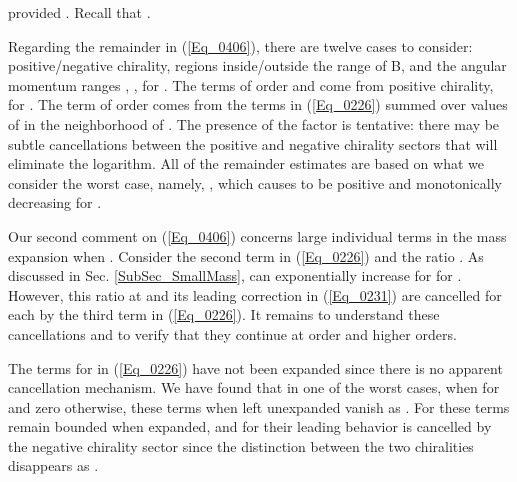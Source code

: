 \documentclass[a4paper,twocolumn,showpacs,preprintnumbers,amsmath,amssymb]{revtex4}
\providecommand{\half}{\frac{1}{2}}
\begin{document}
\noindent
provided \coordHE{}. Recall that
\coordHE{}.

Regarding the remainder in (\ref{Eq_0406}), there are twelve cases to
consider: positive/negative chirality, regions inside/outside the
range of B, and the angular momentum ranges
\coordHE{}, \coordHE{}, \coordHE{} for \coordHE{}. The
terms of order \coordHE{} and
\coordHE{} come from positive chirality,
\coordHE{} for \coordHE{}. The term of order \coordHE{} comes from the
\coordHE{}
terms in (\ref{Eq_0226}) summed over values of \coordHE{} in the neighborhood
of \coordHE{}. The presence of the factor \coordHE{} is
tentative: there may be subtle cancellations between the positive and
negative chirality sectors that will eliminate the logarithm. All of
the \coordHE{} remainder estimates are based on what we consider the
worst case, namely, \coordHE{}, which causes \coordHE{} to be
positive and monotonically decreasing for \coordHE{}.

Our second comment on (\ref{Eq_0406}) concerns large individual terms
in the mass expansion when \coordHE{}. Consider the second term in
(\ref{Eq_0226}) and the ratio \coordHE{}. As
discussed in Sec. \ref{SubSec_SmallMass}, \coordHE{} can exponentially
increase for \coordHE{} for \coordHE{}. However,
this ratio at \coordHE{}  \myHighlight{$(R_{+}(0,a) = a^{l+\half})$}\coordHE{} and its leading
correction \coordHE{} in (\ref{Eq_0231}) are cancelled for each \coordHE{}
by the third term in (\ref{Eq_0226}). It remains to understand these
cancellations and to verify that they continue at order \coordHE{} and
higher orders.

The terms \coordHE{} for \coordHE{} in (\ref{Eq_0226}) have not been expanded since there is no
apparent cancellation mechanism. We have found that in one of the
worst cases, when \coordHE{} for \coordHE{} and zero otherwise, these
terms when left unexpanded vanish as \coordHE{}. For \coordHE{}
these terms remain bounded when expanded, and for \coordHE{}
their leading \coordHE{} behavior is cancelled by the negative chirality
sector since the distinction between the two chiralities disappears as
\coordHE{}.
\end{document}
